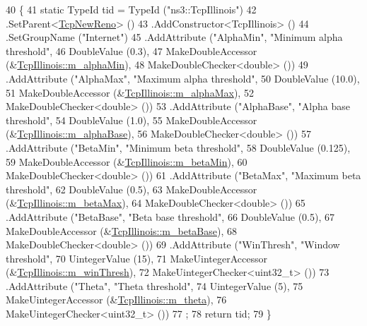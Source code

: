 \begin{DoxyCode}
40 \{
41   \textcolor{keyword}{static} TypeId tid = TypeId (\textcolor{stringliteral}{"ns3::TcpIllinois"})
42     .SetParent<\hyperlink{classns3_1_1TcpNewReno_a81686cb1590be6d7c754029fc8d7cf4e}{TcpNewReno}> ()
43     .AddConstructor<TcpIllinois> ()
44     .SetGroupName (\textcolor{stringliteral}{"Internet"})
45     .AddAttribute (\textcolor{stringliteral}{"AlphaMin"}, \textcolor{stringliteral}{"Minimum alpha threshold"},
46                    DoubleValue (0.3),
47                    MakeDoubleAccessor (&\hyperlink{classns3_1_1TcpIllinois_a5762b0230b8817d99f8b52cabe27c6fc}{TcpIllinois::m\_alphaMin}),
48                    MakeDoubleChecker<double> ())
49     .AddAttribute (\textcolor{stringliteral}{"AlphaMax"}, \textcolor{stringliteral}{"Maximum alpha threshold"},
50                    DoubleValue (10.0),
51                    MakeDoubleAccessor (&\hyperlink{classns3_1_1TcpIllinois_ad9a94e71f8a53c481825f777f1aa6ded}{TcpIllinois::m\_alphaMax}),
52                    MakeDoubleChecker<double> ())
53     .AddAttribute (\textcolor{stringliteral}{"AlphaBase"}, \textcolor{stringliteral}{"Alpha base threshold"},
54                    DoubleValue (1.0),
55                    MakeDoubleAccessor (&\hyperlink{classns3_1_1TcpIllinois_a08e136c96d7a6e38606cd0885aa131d7}{TcpIllinois::m\_alphaBase}),
56                    MakeDoubleChecker<double> ())
57     .AddAttribute (\textcolor{stringliteral}{"BetaMin"}, \textcolor{stringliteral}{"Minimum beta threshold"},
58                    DoubleValue (0.125),
59                    MakeDoubleAccessor (&\hyperlink{classns3_1_1TcpIllinois_a3c0c450a135f937b79940f82c67313d9}{TcpIllinois::m\_betaMin}),
60                    MakeDoubleChecker<double> ())
61     .AddAttribute (\textcolor{stringliteral}{"BetaMax"}, \textcolor{stringliteral}{"Maximum beta threshold"},
62                    DoubleValue (0.5),
63                    MakeDoubleAccessor (&\hyperlink{classns3_1_1TcpIllinois_a8c27408a958faaf52111b0f62b8c81a5}{TcpIllinois::m\_betaMax}),
64                    MakeDoubleChecker<double> ())
65     .AddAttribute (\textcolor{stringliteral}{"BetaBase"}, \textcolor{stringliteral}{"Beta base threshold"},
66                    DoubleValue (0.5),
67                    MakeDoubleAccessor (&\hyperlink{classns3_1_1TcpIllinois_a934a50369de8be5dc9377f0460d5a7e1}{TcpIllinois::m\_betaBase}),
68                    MakeDoubleChecker<double> ())
69     .AddAttribute (\textcolor{stringliteral}{"WinThresh"}, \textcolor{stringliteral}{"Window threshold"},
70                    UintegerValue (15),
71                    MakeUintegerAccessor (&\hyperlink{classns3_1_1TcpIllinois_a57917764f34d9810d239423d2ad3b924}{TcpIllinois::m\_winThresh}),
72                    MakeUintegerChecker<uint32\_t> ())
73     .AddAttribute (\textcolor{stringliteral}{"Theta"}, \textcolor{stringliteral}{"Theta threshold"},
74                    UintegerValue (5),
75                    MakeUintegerAccessor (&\hyperlink{classns3_1_1TcpIllinois_aa612862174116f2e03372322e7f45e51}{TcpIllinois::m\_theta}),
76                    MakeUintegerChecker<uint32\_t> ())
77   ;
78   \textcolor{keywordflow}{return} tid;
79 \}
\end{DoxyCode}


